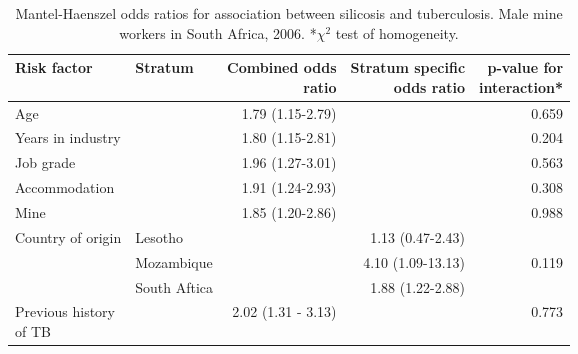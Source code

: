 \documentclass[11pt,a4paper,twoside]{article}\usepackage{graphicx, color}
\begin{document}
\pagebreak[4]
\begin{table}[p]
\begin{tabular}{llrrr}
\toprule 
Risk factor & Stratum & \shortstack{Combined odds \\ratio} & \shortstack{Stratum specific \\odds ratio} & \shortstack{p-value for \\interaction*} \\  
\midrule
Age &  & 1.79 (1.15-2.79) &  & 0.659 \\  
Years in industry &  & 1.80 (1.15-2.81) &  & 0.204 \\  
Job grade &  & 1.96 (1.27-3.01) &  & 0.563 \\  
Accommodation &  & 1.91 (1.24-2.93) &  & 0.308 \\  
Mine &  & 1.85 (1.20-2.86) &  & 0.988 \\  
Country of origin & Lesotho &  & 1.13 (0.47-2.43) & \multicolumn{1}{l}{} \\  
 & Mozambique &  & 4.10 (1.09-13.13) & 0.119 \\ 
 & South Aftica &  & 1.88 (1.22-2.88) & \multicolumn{1}{l}{} \\ 
\shortstack{Previous history \\ of TB} &  & 2.02 (1.31 - 3.13) &  & 0.773 \\ 
\bottomrule
\end{tabular}
\caption{Mantel-Haenszel odds ratios for association between silicosis and tuberculosis. Male mine workers in South Africa, 2006. *$\chi^2$ test of homogeneity.}
\label{mhtab}
\end{table}
\pagebreak[4]
\clearpage
\end{document}
